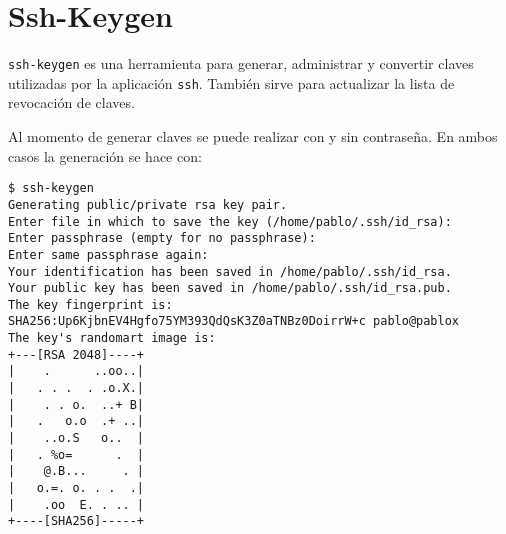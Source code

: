 %
% 
% 
% 








\newpage

\sectionfont{\scshape}


\section*{Ssh-Keygen}

\texttt{ssh-keygen} es una herramienta para generar, administrar y convertir claves utilizadas por la aplicación \texttt{ssh}. También sirve para actualizar la lista de revocación de claves.

Al momento de generar claves se puede realizar con y sin contraseña. En ambos casos la generación se hace con:

\begin{lstlisting}
$ ssh-keygen 
Generating public/private rsa key pair.
Enter file in which to save the key (/home/pablo/.ssh/id_rsa): 
Enter passphrase (empty for no passphrase): 
Enter same passphrase again: 
Your identification has been saved in /home/pablo/.ssh/id_rsa.
Your public key has been saved in /home/pablo/.ssh/id_rsa.pub.
The key fingerprint is:
SHA256:Up6KjbnEV4Hgfo75YM393QdQsK3Z0aTNBz0DoirrW+c pablo@pablox
The key's randomart image is:
+---[RSA 2048]----+
|    .      ..oo..|
|   . . .  . .o.X.|
|    . . o.  ..+ B|
|   .   o.o  .+ ..|
|    ..o.S   o..  |
|   . %o=      .  |
|    @.B...     . |
|   o.=. o. . .  .|
|    .oo  E. . .. |
+----[SHA256]-----+
\end{lstlisting}

